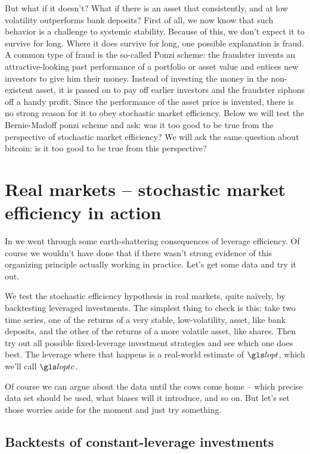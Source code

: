 But what if it doesn't? What if there is an asset that consistently, and at low volatility outperforms bank deposits? 
First of all, we now know that such behavior is a challenge to systemic stability. Because of this, we don't expect it to survive for long. Where it does survive for long, one possible explanation is fraud. A common type of fraud is the so-called Ponzi scheme: the fraudster invents an attractive-looking past performance of a portfolio or asset value and entices new investors to give him their money. Instead of investing the money in the non-existent asset, it is passed on to pay off earlier investors and the fraudster siphons off a handy profit. Since the performance of the asset price is invented, there is no strong reason for it to obey stochastic market efficiency. Below we will test the Bernie-Madoff ponzi scheme and ask: was it too good to be true from the perspective of stochastic market efficiency? We will ask the same question about bitcoin: is it too good to be true from this perspective?

\section{Real markets -- stochastic market efficiency in action}
In  we went through some earth-shattering consequences of leverage efficiency. Of course we wouldn't have done that if there wasn't strong evidence of this organizing principle actually working in practice. Let's get some data and try it out. 

We test the stochastic efficiency hypothesis in real markets, quite na\"ively, by backtesting leveraged investments. The simplest thing to check is this: take two time series, one of the returns of a very stable, low-volatility, asset, like bank deposits, and the other of the returns of a more volatile asset, like shares. Then try out all possible fixed-leverage investment strategies and see which one does best. The leverage where that happens is a real-world estimate of $\lopt$, which we'll call $\loptc$.

Of course we can argue about the data until the cows come home -- which precise data set should be used, what biases will it introduce, and so on. But let's set those worries aside for the moment and just try something.


\subsection{Backtests of constant-leverage investments}

